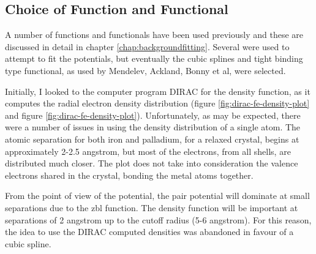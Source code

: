 \subsection{Choice of Function and Functional}

A number of functions and functionals have been used previously and these are discussed in detail in chapter \ref{chap:backgroundfitting}.  Several were used to attempt to fit the potentials, but eventually the cubic splines and tight binding type functional, as used by Mendelev, Ackland, Bonny et al, were selected.

Initially, I looked to the computer program DIRAC for the density function, as it computes the radial electron density distribution (figure \ref{fig:dirac-fe-density-plot} and figure \ref{fig:dirac-fe-density-plot}).  Unfortunately, as may be expected, there were a number of issues in using the density distribution of a single atom.  The atomic separation for both iron and palladium, for a relaxed crystal, begins at approximately 2-2.5 angstrom, but most of the electrons, from all shells, are distributed much closer.  The plot does not take into consideration the valence electrons shared in the crystal, bonding the metal atoms together.

From the point of view of the potential, the pair potential will dominate at small separations due to the \acrshort{zbl} function.  The density function will be important at separations of 2 angstrom up to the cutoff radius (5-6 angstrom).  For this reason, the idea to use the DIRAC computed densities was abandoned in favour of a cubic spline.

